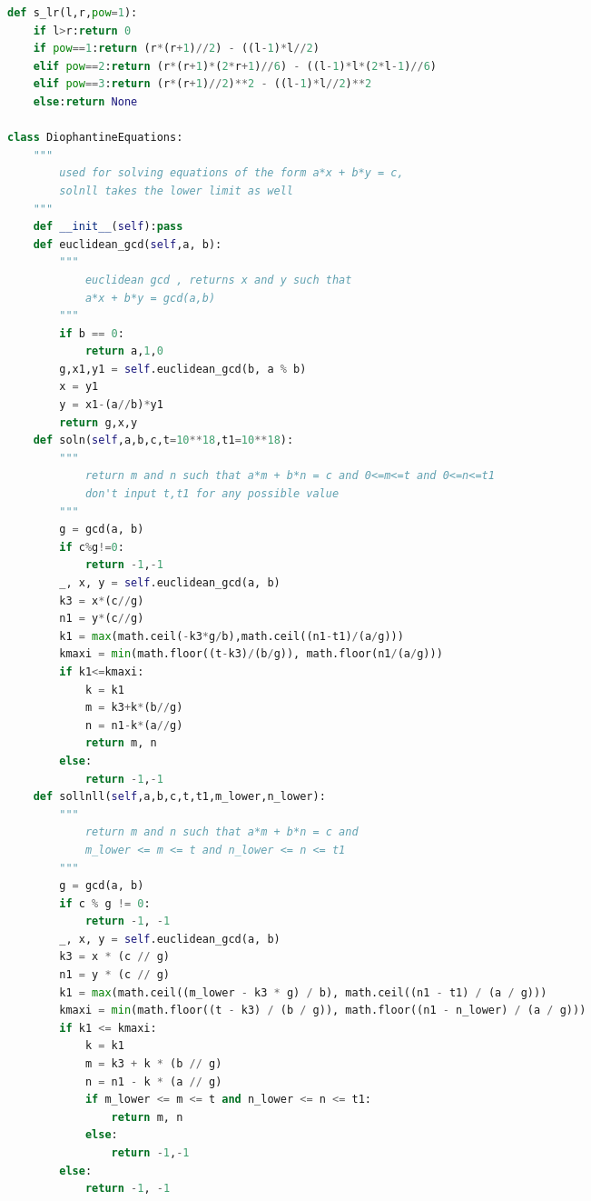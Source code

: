 \documentclass[10pt,landscape, a4paper]{article}
\begin{document}
\begin{multicols*}{3}
\begin{lstlisting}[language=Python]
def s_lr(l,r,pow=1):
    if l>r:return 0
    if pow==1:return (r*(r+1)//2) - ((l-1)*l//2)
    elif pow==2:return (r*(r+1)*(2*r+1)//6) - ((l-1)*l*(2*l-1)//6)
    elif pow==3:return (r*(r+1)//2)**2 - ((l-1)*l//2)**2
    else:return None

class DiophantineEquations:
    """
        used for solving equations of the form a*x + b*y = c,
        solnll takes the lower limit as well
    """
    def __init__(self):pass
    def euclidean_gcd(self,a, b):
        """
            euclidean gcd , returns x and y such that
            a*x + b*y = gcd(a,b)
        """
        if b == 0:
            return a,1,0
        g,x1,y1 = self.euclidean_gcd(b, a % b)
        x = y1
        y = x1-(a//b)*y1
        return g,x,y
    def soln(self,a,b,c,t=10**18,t1=10**18):
        """
            return m and n such that a*m + b*n = c and 0<=m<=t and 0<=n<=t1
            don't input t,t1 for any possible value
        """
        g = gcd(a, b)
        if c%g!=0:
            return -1,-1
        _, x, y = self.euclidean_gcd(a, b)
        k3 = x*(c//g)
        n1 = y*(c//g)
        k1 = max(math.ceil(-k3*g/b),math.ceil((n1-t1)/(a/g)))
        kmaxi = min(math.floor((t-k3)/(b/g)), math.floor(n1/(a/g)))
        if k1<=kmaxi:
            k = k1
            m = k3+k*(b//g)
            n = n1-k*(a//g)
            return m, n
        else:
            return -1,-1
    def sollnll(self,a,b,c,t,t1,m_lower,n_lower):
        """
            return m and n such that a*m + b*n = c and
            m_lower <= m <= t and n_lower <= n <= t1
        """
        g = gcd(a, b)
        if c % g != 0:
            return -1, -1
        _, x, y = self.euclidean_gcd(a, b)
        k3 = x * (c // g)
        n1 = y * (c // g)
        k1 = max(math.ceil((m_lower - k3 * g) / b), math.ceil((n1 - t1) / (a / g)))
        kmaxi = min(math.floor((t - k3) / (b / g)), math.floor((n1 - n_lower) / (a / g)))
        if k1 <= kmaxi:
            k = k1
            m = k3 + k * (b // g)
            n = n1 - k * (a // g)
            if m_lower <= m <= t and n_lower <= n <= t1:
                return m, n
            else:
                return -1,-1
        else:
            return -1, -1
\end{lstlisting}


\end{multicols*}
\end{document}

